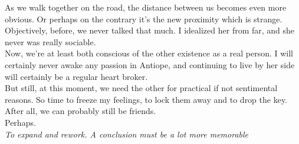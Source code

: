 \documentclass{report}
\newcommand{\dcomment}[1]{
	\emph{#1}
	\\
}
\begin{document}
As we walk together on the road, the distance between us becomes even more obvious. Or perhaps on the contrary it's the new proximity which is strange. Objectively, before, we never talked that much. I idealized her from far, and she never was really sociable.\\

Now, we're at least both conscious of the other existence as a real person. I will certainly never awake any passion in Antiope, and continuing to live by her side will certainly be a regular heart broker.\\

But still, at this moment, we need the other for practical if not sentimental reasons. So time to freeze my feelings, to lock them away and to drop the key.\\

After all, we can probably still be friends.\\

Perhaps.\\

\dcomment{
	To expand and rework. A conclusion must be a lot more memorable
}
\end{document}
